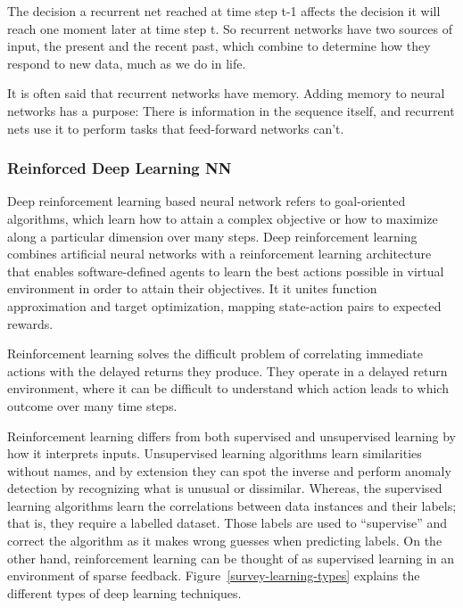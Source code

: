 \documentclass[10pt]{llncs}
\begin{document}
The decision a recurrent net reached at time step t-1 affects the decision it will reach one moment later at time step t. So recurrent networks have two sources of input, the present and the recent past, which combine to determine how they respond to new data, much as we do in life.

It is often said that recurrent networks have memory. Adding memory to neural networks has a purpose: There is information in the sequence itself, and recurrent nets use it to perform tasks that feed-forward networks can’t.

\subsubsection{Reinforced Deep Learning NN}
Deep reinforcement learning based neural network refers to goal-oriented algorithms, which learn how to attain a complex objective or how to maximize along a particular dimension over many steps. Deep reinforcement learning combines artificial neural networks with a reinforcement learning architecture that enables software-defined agents to learn the best actions possible in virtual environment in order to attain their objectives. It it unites function approximation and target optimization, mapping state-action pairs to expected rewards.

Reinforcement learning solves the difficult problem of correlating immediate actions with the delayed returns they produce. They operate in a delayed return environment, where it can be difficult to understand which action leads to which outcome over many time steps.

Reinforcement learning differs from both supervised and unsupervised learning by how it interprets inputs. Unsupervised learning algorithms learn similarities without names, and by extension they can spot the inverse and perform anomaly detection by recognizing what is unusual or dissimilar. Whereas, the supervised learning algorithms learn the correlations between data instances and their labels; that is, they require a labelled dataset. Those labels are used to “supervise” and correct the algorithm as it makes wrong guesses when predicting labels. On the other hand, reinforcement learning can be thought of as supervised learning in an environment of sparse feedback. Figure~\ref{survey-learning-types} explains the different types of deep learning techniques.
\end{document}
